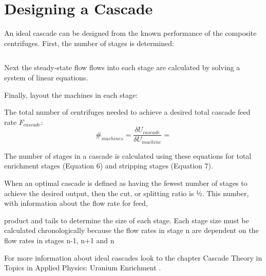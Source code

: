 \section{Designing a Cascade}
An ideal cascade can be designed from the known performance of the composite centrifuges. First, the number of stages is determined:

\begin{equation}
  \label{eqn:n_stages}

\end{equation}


Next the steady-state flow flows into each stage are calculated by solving a system of linear equations.


Finally, layout the machines in each stage:









The total number of centrifuges needed to achieve a desired total cascade feed rate $F_{cascade}$:
\begin{equation}
  \label{eqn:n_mach}
  \#_{machines} = \frac{\delta U_{cascade}}{\delta U_{machine}}
  = 
  \end{equation}



The number of stages in a cascade is calculated using these equations for total enrichment stages (Equation 6) and stripping stages (Equation 7).



When an optimal cascade is defined as having the fewest number of stages to achieve the desired output, then the cut, or splitting ratio is ½. This number, with information about the flow rate for feed, 

product and tails to determine the size of each stage. Each stage size must be calculated chronologically because the flow rates in stage n are dependent on the flow rates in stages n-1, n+1 and n


For more information about ideal cascades look to the chapter Cascade Theory in Topics in Applied Physics: Uranium Enrichment \cite{Cascade_?}.%
